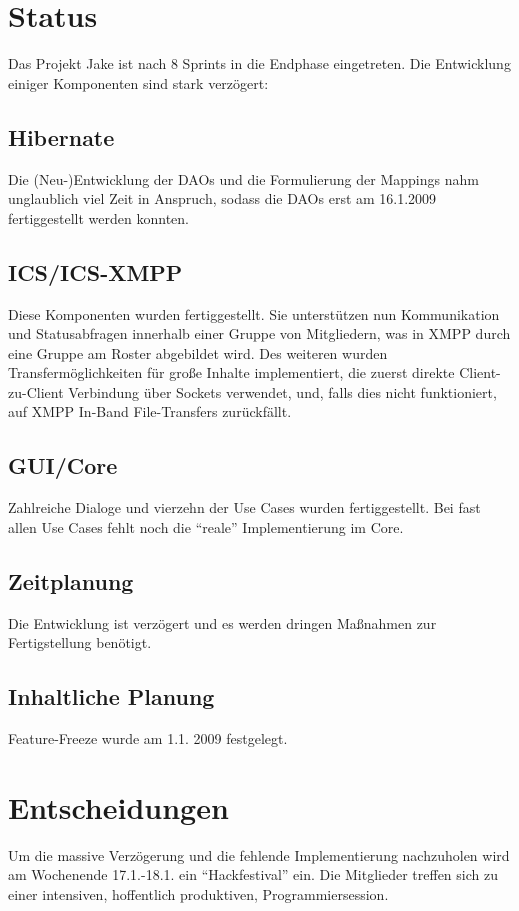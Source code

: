 \setcounter{chapter}{1}
\section{Status}
Das Projekt Jake ist nach 8 Sprints in die Endphase eingetreten. Die Entwicklung einiger Komponenten sind stark verzögert:

\subsection{Hibernate}
Die (Neu-)Entwicklung der DAOs und die Formulierung der Mappings nahm unglaublich viel Zeit in Anspruch, sodass die DAOs erst am 16.1.2009 fertiggestellt werden konnten.

\subsection{ICS/ICS-XMPP}
Diese Komponenten wurden fertiggestellt. Sie unterstützen nun Kommunikation und Statusabfragen innerhalb einer Gruppe von Mitgliedern, was in XMPP durch eine Gruppe am Roster abgebildet wird. Des weiteren wurden Transfermöglichkeiten für große Inhalte implementiert, die zuerst direkte Client-zu-Client Verbindung über Sockets verwendet, und, falls dies nicht funktioniert, auf XMPP In-Band File-Transfers zurückfällt.

\subsection{GUI/Core}
Zahlreiche Dialoge und vierzehn der Use Cases wurden fertiggestellt. Bei fast allen Use Cases fehlt noch die ``reale'' Implementierung im Core.

\subsection{Zeitplanung}
Die Entwicklung ist verzögert und es werden dringen Maßnahmen zur Fertigstellung benötigt.

\subsection{Inhaltliche Planung}
Feature-Freeze wurde am 1.1. 2009 festgelegt.

\section{Entscheidungen}
Um die massive Verzögerung und die fehlende Implementierung nachzuholen wird am Wochenende 17.1.-18.1. ein ``Hackfestival'' ein. Die Mitglieder treffen sich zu einer intensiven, hoffentlich produktiven, Programmiersession.









